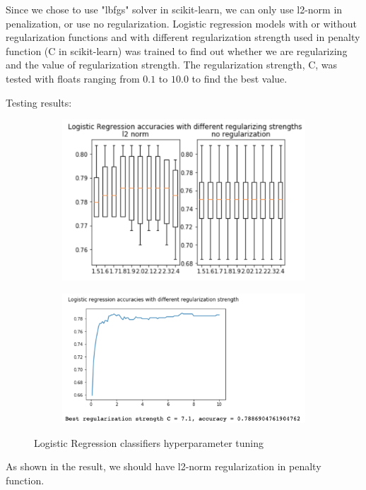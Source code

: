 \documentclass[11.5pt]{article}
\begin{document}
\begin{enumerate}
\begin{itemize}
\begin{enumerate}
                Since we chose to use "lbfgs" solver in scikit-learn, we can only use l2-norm in penalization, or use no regularization.
                Logistic regression models with or without regularization functions and with different regularization strength used in penalty function (C in scikit-learn) was trained to find out whether we are regularizing and the value of regularization strength.
                The regularization strength, C, was tested with floats ranging from $0.1$ to $10.0$ to find the best value.

                Testing results:

                \begin{figure}[h!]
                    \begin{subfigure}[b]{0.5\linewidth}
                        \centering
                        \includegraphics[width=\linewidth]{images/log_reg_hyperparam_penalty.png}
                    \end{subfigure}
                    \begin{subfigure}[b]{0.5\linewidth}
                        \centering
                        \includegraphics[width=\linewidth]{images/log_reg_hyperparam_c.png}
                    \end{subfigure}
                    \caption{Logistic Regression classifiers hyperparameter tuning}
                \end{figure}
                As shown in the result, we should have l2-norm regularization in penalty function.


\end{enumerate}
\end{itemize}
\end{enumerate}
\end{document}
